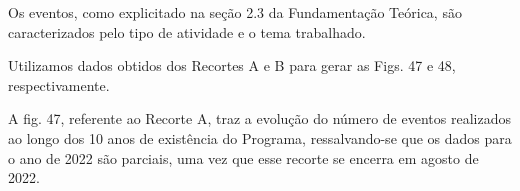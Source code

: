 \documentclass[
12pt,		%
openright,	%
twoside,  %
a4paper,			%
chapter=TITLE,		%
english,			%
french,				%
spanish,			%
brazil				%
]{USPSC-classe/USPSC}
\begin{document}
Os eventos, como explicitado na se\c{c}\~ao 2.3 da Fundamenta\c{c}\~ao Te\'orica, s\~ao caracterizados pelo tipo de atividade e o tema trabalhado.









Utilizamos dados obtidos dos Recortes A e B para gerar as Figs. 47 e 48, respectivamente.









A fig. 47, referente ao Recorte A, traz a evolu\c{c}\~ao do n\'umero de eventos realizados ao longo dos 10 anos de exist\^encia do Programa, ressalvando-se que os dados para o ano de 2022 s\~ao parciais, uma vez que esse recorte se encerra em agosto de 2022.
\end{document}
